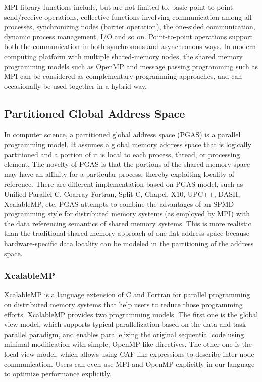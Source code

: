 MPI library functions include, but are not limited to, basic point-to-point send/receive operations, collective functions involving communication among all processes, synchronizing nodes (barrier operation), the one-sided communication, dynamic process management, I/O and so on. Point-to-point operations support both the communication in both synchronous and asynchronous ways. In modern computing platform with multiple shared-memory nodes, the shared memory programming models such as OpenMP and message passing programming such as MPI can be considered as complementary programming approaches, and can occasionally be used together in a hybrid way.

\subsection{Partitioned Global Address Space}

In computer science, a partitioned global address space (PGAS) is a parallel programming model. It assumes a global memory address space that is logically partitioned and a portion of it is local to each process, thread, or processing element. The novelty of PGAS is that the portions of the shared memory space may have an affinity for a particular process, thereby exploiting locality of reference. There are different implementation based on PGAS model, such as Unified Parallel C, Coarray Fortran, Split-C, Chapel, X10, UPC++, DASH, XcalableMP, etc. PGAS attempts to combine the advantages of an SPMD programming style for distributed memory systems (as employed by MPI) with the data referencing semantics of shared memory systems. This is more realistic than the traditional shared memory approach of one flat address space because hardware-specific data locality can be modeled in the partitioning of the address space.

\subsubsection{XcalableMP}

XcalableMP \cite{lee2010implementation} is a language extension of C and Fortran for parallel programming on distributed memory systems that help users to reduce those programming efforts. XcalableMP provides two programming models. The first one is the global view model, which supports typical parallelization based on the data and task parallel paradigm, and enables parallelizing the original sequential code using minimal modification with simple, OpenMP-like directives. The other one is the local view model, which allows using CAF-like expressions to describe inter-node communication. Users can even use MPI and OpenMP explicitly in our language to optimize performance explicitly.

